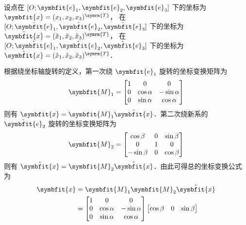 \begin{solution}
    设点在 $[O; \symbfit{e}_1, \symbfit{e}_2, \symbfit{e}_3]$ 下的坐标为 $\symbfit{x} = (x_1, x_2, x_3)^{\symrm{T}}$，
    在 $[O; \tilde{\symbfit{e}}_1, \tilde{\symbfit{e}}_2, \tilde{\symbfit{e}}_3]$ 下的坐标为 $\tilde{\symbfit{x}} = (\tilde{x}_1, \tilde{x}_2, \tilde{x}_3)^{\symrm{T}}$，
    在 $[O; \hat{\symbfit{e}}_1, \allowbreak \hat{\symbfit{e}}_2, \allowbreak \hat{\symbfit{e}}_3]$ 下的坐标为 $\hat{\symbfit{x}} = (\hat{x}_1, \hat{x}_2, \hat{x}_3)^{\symrm{T}}$．

    根据绕坐标轴旋转的定义，第一次绕 $\symbfit{e}_1$ 旋转的坐标变换矩阵为
    \begin{equation}
        \symbfit{M}_1 = \begin{bmatrix}
            1 & 0          & 0           \\
            0 & \cos\alpha & -\sin\alpha \\
            0 & \sin\alpha & \cos\alpha
        \end{bmatrix}
    \end{equation}
    则有 $\symbfit{x} = \symbfit{M}_1 \tilde{\symbfit{x}}$．第二次绕新系的 $\tilde{\symbfit{e}}_2$ 旋转的坐标变换矩阵为
    \begin{equation}
        \symbfit{M}_2 = \begin{bmatrix}
            \cos\beta  & 0 & \sin\beta \\
            0          & 1 & 0         \\
            -\sin\beta & 0 & \cos\beta
        \end{bmatrix}
    \end{equation}
    则有 $\tilde{\symbfit{x}} = \symbfit{M}_2 \hat{\symbfit{x}}$．由此可得总的坐标变换公式为
    \begin{equation}
        \begin{aligned}
            \symbfit{x} & = \symbfit{M}_1 \symbfit{M}_2 \hat{\symbfit{x}}                \\
                        & = \begin{bmatrix}
                                1 & 0          & 0           \\
                                0 & \cos\alpha & -\sin\alpha \\
                                0 & \sin\alpha & \cos\alpha
                            \end{bmatrix} \begin{bmatrix}
                                              \cos\beta  & 0 & \sin\beta \\

\end{bmatrix}
\end{aligned}
\end{equation}
\end{solution}
